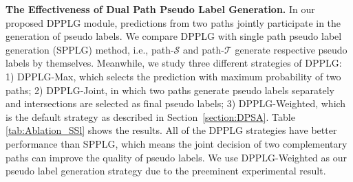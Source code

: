 \documentclass[10pt,twocolumn,letterpaper]{article}
\begin{document}
{\noindent \textbf{The Effectiveness of Dual Path Pseudo Label Generation.}}\hspace{3pt}
In our proposed DPPLG module, predictions from two paths jointly participate in the generation of pseudo labels. We compare DPPLG with single path pseudo label generation (SPPLG) method, i.e., path-$\mathcal{S}$ and path-$\mathcal{T}$ generate respective pseudo labels by themselves. Meanwhile, we study three different strategies of DPPLG: 1) DPPLG-Max, which selects the prediction with maximum probability of two paths; 2) DPPLG-Joint, in which two paths generate pseudo labels separately and intersections are selected as final pseudo labels; 3) DPPLG-Weighted, which is the default strategy as described in Section~\ref{section:DPSA}. Table \ref{tab:Ablation_SSl} shows the results. All of the DPPLG strategies have better performance than SPPLG, which means the joint decision of two complementary paths can improve the quality of pseudo labels. We use DPPLG-Weighted as our pseudo label generation strategy due to the preeminent experimental result.
\end{document}
